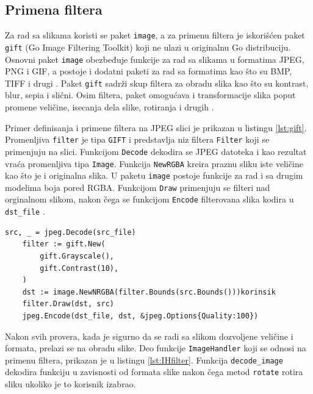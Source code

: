 \documentclass[12pt,oneside]{memoir}
\begin{document}
\subsection{Primena filtera}

Za rad sa slikama koristi se paket \texttt{image}, a za primenu filtera je iskorišćen paket \texttt{gift} (Go Image Filtering Toolkit) \cite{gift} koji ne ulazi u originalnu Go distribuciju. Osnovni paket \texttt{image} obezbeđuje funkcije za rad sa slikama u formatima JPEG, PNG i GIF, a postoje i dodatni paketi za rad sa formatima kao što su BMP, TIFF i drugi \cite{image}. Paket \texttt{gift}  sadrži skup filtera za obradu slika kao što su kontrast, blur, sepia i slični. Osim filtera, paket omogućava i transformacije slika poput promene veličine, isecanja dela slike, rotiranja i drugih \cite{gift}.

Primer definisanja i primene filtera na JPEG slici je prikazan u listingu \ref{lst:gift}. Promenljiva \texttt{filter} je tipa  \texttt{GIFT} i predstavlja niz filtera \texttt{Filter} koji se primenjuju na slici. Funkcijom \texttt{Decode} dekodira se JPEG datoteka i kao rezultat vraća promenljiva tipa  \texttt{Image}.  Funkcija \texttt{NewRGBA} kreira praznu sliku iste veličine kao što je i originalna slika. U paketu \texttt{image} postoje funkcije za rad i sa drugim modelima boja pored RGBA. Funkcijom  \texttt{Draw} primenjuju se filteri nad orginalnom slikom, nakon čega se funkcijom  \texttt{Encode} filterovana slika kodira u  \texttt{dst\_file} \cite{gift}.

\begin{center}
\begin{lstlisting}[caption=Definisanje i primena filtera,label={lst:gift},  backgroundcolor=\color{background}]
	src, _ = jpeg.Decode(src_file)
	filter := gift.New(
		gift.Grayscale(),
		gift.Contrast(10),
	)
	dst := image.NewNRGBA(filter.Bounds(src.Bounds()))korinsik
	filter.Draw(dst, src)
	jpeg.Encode(dst_file, dst, &jpeg.Options{Quality:100})
\end{lstlisting}
\end{center}

Nakon svih provera, kada je sigurno da se radi sa slikom dozvoljene veličine i formata, prelazi se na obradu slike. Deo funkcije  \texttt{ImageHandler} koji se odnosi na primenu filtera, prikazan je u listingu \ref{lst:IHfilter}. Funkcija  \texttt{decode\_image} dekodira funkciju u zavisnosti od formata slike nakon čega metod  \texttt{rotate} rotira sliku ukoliko je to korisnik izabrao. 
\end{document}
